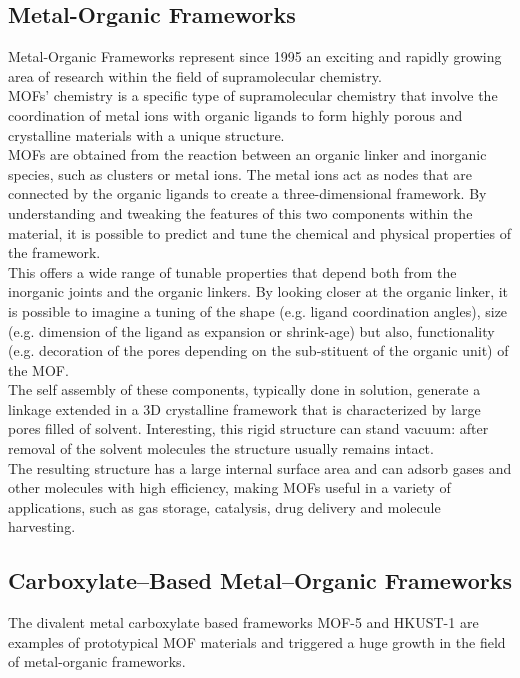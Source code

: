 \documentclass[../Master.tex]{subfiles}
\begin{document}
\subsection{Metal-Organic Frameworks}\label{subsec:mof}
Metal-Organic Frameworks represent since 1995 \cite{yaghi_hydrothermal_1995} an exciting and rapidly growing area of research within the field of supramolecular chemistry.\\
MOFs' chemistry is a specific type of supramolecular chemistry that involve the coordination of metal ions with organic ligands to form highly porous and crystalline materials with a unique structure. \\
MOFs are obtained from the reaction between an organic linker and inorganic species, such as clusters or metal ions. The metal ions act as nodes that are connected by the organic ligands to create a three-dimensional framework. By understanding and tweaking the features of this two components within the material, it is possible to predict and tune the chemical and physical properties of the framework.\\
This offers a wide range of tunable properties that depend both from the inorganic joints and the organic linkers. By looking closer at the organic linker, it is possible to imagine a tuning of the shape (e.g. ligand coordination angles), size (e.g. dimension of the ligand as expansion or shrink-age) but also, functionality (e.g. decoration of the pores depending on the sub-stituent of the organic unit) of the MOF.\\
The self assembly of these components, typically done in solution, generate a linkage extended in a 3D crystalline framework that is characterized by large pores filled of solvent. Interesting, this rigid structure can stand vacuum: after removal of the solvent molecules the structure usually remains intact. \\
The resulting structure has a large internal surface area and can adsorb gases and other molecules with high efficiency, making MOFs useful in a variety of applications, such as gas storage, catalysis, drug delivery and molecule harvesting.

\subsection{Carboxylate–Based Metal–Organic Frameworks}\label{cb-mof}
The divalent metal carboxylate based frameworks MOF-5 and HKUST-1 are examples of prototypical MOF materials and triggered a huge growth in the field of metal-organic frameworks.
\end{document}
